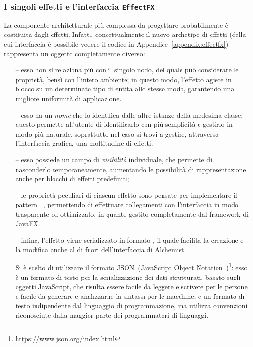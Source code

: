             \subsubsection{I singoli effetti e l'interfaccia \texttt{EffectFX}}\label{subsub:effectFX}
                La componente architetturale più complessa da progettare probabilmente è costituita dagli effetti.
                Infatti, concettualmente il nuovo archetipo di effetti (della cui interfaccia è possibile vedere il codice in Appendice~\ref{appendix:effectfx}) rappresenta un oggetto completamente diverso:
                \begin{itemize}
                    \item[--]\label{itm:eFXEnv} esso non si relaziona più con il singolo nodo, del quale può considerare le proprietà, bensì con l'intero ambiente; in questo modo, l'effetto agisce in blocco su un determinato tipo di entità allo stesso modo, garantendo una migliore uniformità di applicazione.
                    \item[--]\label{itm:eFXName} esso ha un \emph{nome} che lo identifica dalle altre istanze della medesima classe; questo permette all'utente di identificarlo con più semplicità e gestirlo in modo più naturale, soprattutto nel caso si trovi a gestire, attraverso l’interfaccia grafica, una moltitudine di effetti.
                    \item[--]\label{itm:eFXVis} esso possiede un campo di \emph{visibilità} individuale, che permette di nasconderlo temporaneamente, aumentando le possibilità di rappresentazione anche per blocchi di effetti predefiniti;
                    \item[--]\label{itm:json} le proprietà peculiari di ciascun effetto sono pensate per implementare il pattern ~\cite{observer}, permettendo di effettuare collegamenti con l'interfaccia in modo trasparente ed ottimizzato, in quanto gestito completamente dal framework di JavaFX.
                    \item[--]\label{itm:eFXjson} infine, l'effetto viene serializzato in formato , il quale facilita la creazione e la modifica anche al di fuori dell'interfaccia di Alchemist.

                    Si è scelto di utilizzare il formato JSON~(JavaScript Object Notation~\cite{json})\footnote{\url{https://www.json.org/index.html}}: esso è un formato di testo per la serializzazione dei dati strutturati, basato sugli oggetti JavaScript, che risulta essere facile da leggere e scrivere per le persone e facile da generare e analizzarne la sintassi per le macchine; è un formato di testo indipendente dal linguaggio di programmazione, ma utilizza convenzioni riconosciute dalla maggior parte dei programmatori di linguaggi.
                \end{itemize}

